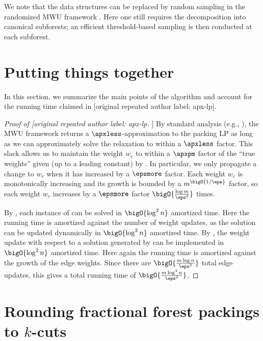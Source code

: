 \documentclass{toc}
\newcommand{\weight}[1]{w_{#1}}
\newcommand{\wrt}{with respect to\xspace} %
\begin{document}
We note that the  data structures can be replaced
by random sampling in the randomized MWU framework
\cite{cq-18-soda}. Here one still requires the decomposition into
canonical subforests; an efficient threshold-based sampling is then
conducted at each subforest.

\section{Putting things together}
 In this section, we summarize the main points
of the algorithm and account for the running time claimed in
[original repeated author label: apx-lp].

%
%
%
%
\begin{proof}[Proof of [original repeated author label: apx-lp]]
  By standard analysis (e.g., \cite[Theorem 2.1]{cq-17-soda}), the MWU
  framework returns a $\apxless$-approximation %
  to the packing LP  as long as we can
%
approximately solve %
the relaxation  to within a
  $\apxless$ factor. %
This slack allows us to maintain
  the weight $\weight{e}$ to within a $\apxpm$ factor %
  of the ``true weights'' given (up to a leading constant) by
  .  In particular, we only propagate a
  change to $\weight{e}$ when it has increased by a
  $\epsmore$ factor.  %
Each weight $\weight{e}$ is
  monotonically increasing and its growth is bounded by a
  $m^{\bigO{1/\eps}}$ factor,   %
so each weight
  $\weight{e}$ increases by a $\epsmore$ factor  %
  $\bigO{\frac{\log m}{\eps^2}}$ times.


  By , each instance of
   can be solved in $\bigO{\log^2 n}$
  amortized time. Here the running time is amortized against the
  number of weight updates, as the solution can be updated dynamically
  in $\bigO{\log^2 n}$ amortized time. By
  , the weight update \wrt a solution
  generated by  can be implemented in
  $\bigO{\log^2 n}$ amortized time. Here again the running time is
  amortized against the growth of the edge weights. Since there are
  $\bigO{\frac{m \log n}{\eps^2}}$ total edge updates, this gives a
  total running time of $\bigO{\frac{m \log^3 n}{\eps^2}}$.
\end{proof}

\section{Rounding fractional forest packings to $k$-cuts}
\end{document}
